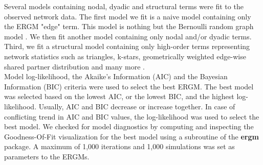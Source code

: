 Several models containing nodal, dyadic and structural terms were fit to the observed network data. The first model we fit is a naive model containing only the ERGM "edge" term. This model is nothing but the Bernoulli random graph model \cite{erdos_random_1959}. We then fit another model containing only nodal and/or dyadic terms. Third, we fit a structural model containing only high-order terms representing network statistics such as triangles, k-stars, geometrically weighted edge-wise shared partner distribution and many more \cite{kolaczyk_statistical_2014,robins_introduction_2007}. \\
Model log-likelihood, the Akaike's Information (AIC) and the Bayesian Information (BIC) criteria were used to select the best ERGM. The best model was selected based on the lowest AIC, or the lowest BIC, and the highest log-likelihood. Usually, AIC and BIC decrease or increase together. In case of conflicting trend in AIC and BIC values, the log-likelihood was used to select the best model. We checked for model diagnostics by computing and inspecting the Goodness-Of-Fit visualization for the best model using a subroutine of the \textbf{ergm} package. %
A maximum of 1,000 iterations and 1,000 simulations was set as parameters to the ERGMs.

